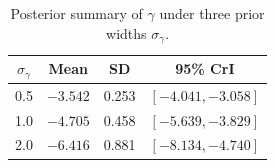 \documentclass[twoside,11pt]{article}
\begin{document}
\begin{table}[ht!]
\vspace{-1.0em} %
\centering
\scriptsize 
\setlength{\tabcolsep}{4pt} 
\renewcommand{\arraystretch}{0.9} 
\caption{Posterior summary of $\gamma$ under three prior widths $\sigma_\gamma$.}
\vspace{-0.5em} %
\label{tab:mnar-gamma}
\begin{tabular}{cccc}
\toprule
$\sigma_\gamma$ & Mean & SD & 95\% CrI \\
\midrule
0.5 & $-3.542$ & 0.253 & $[-4.041, -3.058]$ \\
1.0 & $-4.705$ & 0.458 & $[-5.639, -3.829]$ \\
2.0 & $-6.416$ & 0.881 & $[-8.134, -4.740]$ \\
\bottomrule
\end{tabular}
\vspace{-1.5em} %
\end{table}
 
\end{document}
